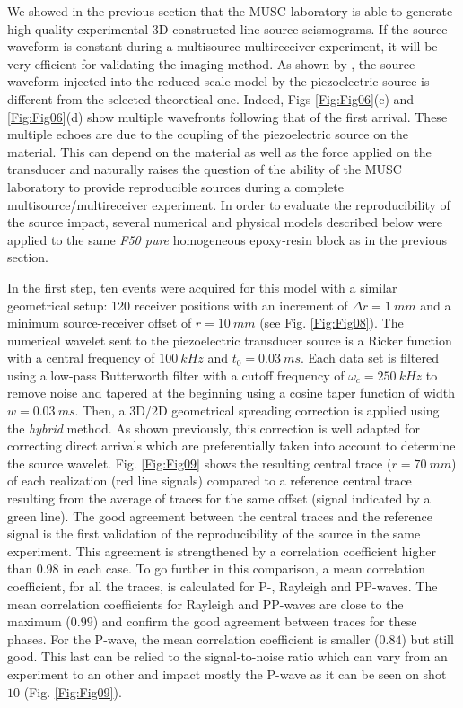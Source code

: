 \documentclass[extra,mreferee]{gji}
\begin{document}
We showed in the previous section that the MUSC laboratory is able to generate high quality experimental 3D constructed line-source seismograms. If the source waveform is constant during a multisource-multireceiver experiment, it will be very efficient for validating the imaging method. As shown by \cite{bretaudeau2011ssm}, the source waveform injected into the reduced-scale model by the piezoelectric source is different from the selected theoretical one. Indeed, Figs \ref{Fig:Fig06}(c) and \ref{Fig:Fig06}(d) show multiple wavefronts following that of the first arrival. These multiple echoes are due to the coupling of the piezoelectric source on the material. This can depend on the material as well as the force applied on the transducer and naturally raises the question of the ability of the MUSC laboratory to provide reproducible sources during a complete multisource/multireceiver experiment. In order to evaluate the reproducibility of the source impact, several numerical and physical models described below were applied to the same \textit{F50 pure} homogeneous epoxy-resin block as in the previous section.

In the first step, ten events were acquired for this model with a similar geometrical setup: 120 receiver positions with an increment of $\Delta r= 1\ mm$ and a minimum source-receiver offset of $r=10\ mm$ (see Fig. \ref{Fig:Fig08}). The numerical wavelet sent to the piezoelectric transducer source is a Ricker function with a central frequency of $100\ kHz$ and $t_{0}=0.03\ ms$. Each data set is filtered using a low-pass Butterworth filter with a cutoff frequency of $\omega_{c}=250\ kHz$ to remove noise and tapered at the beginning using a cosine taper function of width $w=0.03\ ms$. Then, a 3D/2D geometrical spreading correction is applied using the \textit{hybrid} method. As shown previously, this correction is well adapted for correcting direct arrivals which are preferentially taken into account to determine the source wavelet. Fig. \ref{Fig:Fig09} shows the resulting central trace ($r=70\ mm$) of each realization (red line signals) compared to a reference central trace resulting from the average of traces for the same offset (signal indicated by a green line). The good agreement between the central traces and the reference signal is the first validation of the reproducibility of the source in the same experiment. This agreement is strengthened by a correlation coefficient higher than $0.98$ in each case. To go further in this comparison, a mean correlation coefficient, for all the traces, is calculated for P-, Rayleigh and PP-waves. The mean correlation coefficients for Rayleigh and PP-waves are close to the maximum ($0.99$) and confirm the good agreement between traces for these phases. For the P-wave, the mean correlation coefficient is smaller ($0.84$) but still good. This last can be relied to the signal-to-noise ratio which can vary from an experiment to an other and impact mostly the P-wave as it can be seen on shot $10$ (Fig. \ref{Fig:Fig09}).
\end{document}

